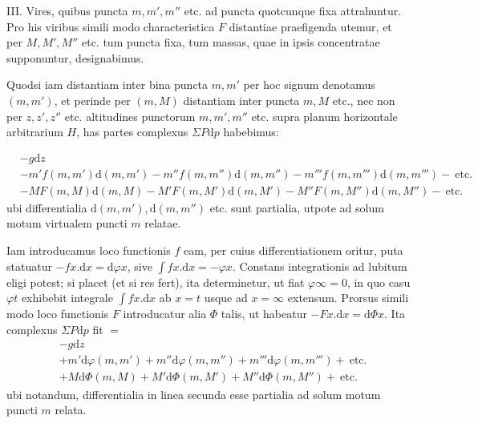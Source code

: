 III. Vires, quibus puncta $m,m',m''$ etc. ad puncta quotcunque fixa attrahuntur. Pro his viribus simili modo characteristica $F$ distantiae praefigenda utemur, et per $M,M',M''$ etc. tum puncta fixa, tum massas, quae in ipsis concentratae supponuntur, designabimus.

Quodsi iam distantiam inter bina puncta $m,m'$ per hoc signum denotamus $(m,m')$, et perinde per $(m,M)$ distantiam inter puncta $m,M$ etc., nec non per $z,z',z''$ etc. altitudines punctorum $m,m',m''$ etc. supra planum horizontale arbitrarium $H$, has partes complexus $\Sigma P\mathrm{d}p$ habebimus:
\par\begingroup\small
\[
\begin{aligned}
&-g\mathrm{d}z\\
&-m'f(m,m')\mathrm{d}(m,m')-m''f(m,m'')\mathrm{d}(m,m'')-m'''f(m,m''')\mathrm{d}(m,m''')-\ \text{etc.}\\
&-MF(m,M)\mathrm{d}(m,M)-M'F(m,M')\mathrm{d}(m,M')-M''F(m,M'')\mathrm{d}(m,M'')-\ \text{etc.}
\end{aligned}
\]
\endgroup
ubi differentialia $\mathrm{d}(m,m'),\mathrm{d}(m,m'')$ etc. sunt partialia, utpote ad solum motum virtualem puncti $m$ relatae.

Iam introducamus loco functionis $f$ eam, per cuius differentiationem oritur, puta statuatur $-fx.\mathrm{d}x=\mathrm{d}\varphi x$, sive $\int fx.\mathrm{d}x=-\varphi x$. Constans integrationis ad lubitum eligi potest; si placet (et si res fert), ita determinetur, ut fiat $\varphi\infty=0$, in quo casu $\varphi t$ exhibebit integrale $\int fx.\mathrm{d}x$ ab $x=t$ usque ad $x=\infty$ extensum. Prorsus simili modo loco functionis $F$ introducatur alia $\Phi$ talis, ut habeatur $-Fx.\mathrm{d}x=\mathrm{d}\Phi x$. Ita complexus $\Sigma P\mathrm{d}p$ fit $=$
\[
\begin{aligned}
&-g\mathrm{d}z\\
&+m'\mathrm{d}\varphi(m,m')+m''\mathrm{d}\varphi(m,m'')+m'''\mathrm{d}\varphi(m,m''')+\ \text{etc.}\\
&+M\mathrm{d}\Phi(m,M)+M'\mathrm{d}\Phi(m,M')+M''\mathrm{d}\Phi(m,M'')+\ \text{etc.}
\end{aligned}
\]
ubi notandum, differentialia in linea secunda esse partialia ad solum motum puncti $m$ relata.

